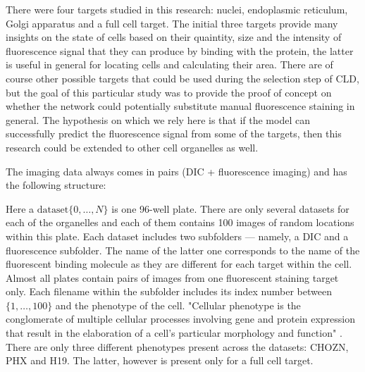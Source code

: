 There were four targets studied in this research: nuclei, endoplasmic reticulum, Golgi apparatus and a full cell target. The initial three targets provide many insights on the state of cells based on their quaintity, size and the intensity of fluorescence signal that they can produce by binding with the protein, the latter is useful in general for locating cells and calculating their area. There are of course other possible targets that could be used during the selection step of CLD, but the goal of this particular study was to provide the proof of concept on whether the network could potentially substitute manual fluorescence staining in general. The hypothesis on which we rely here is that if the model can successfully predict the fluorescence signal from some of the targets, then this research could be extended to other cell organelles as well.

The imaging data always comes in pairs (DIC + fluorescence imaging) and has the following structure:



Here a $\text{dataset}\{0, \ldots, N\}$ is one 96-well plate. There are only several datasets for each of the organelles and each of them contains 100 images of random locations within this plate. Each dataset includes two subfolders --- namely, a DIC and a fluorescence subfolder. The name of the latter one corresponds to the name of the fluorescent binding molecule as they are different for each target within the cell. Almost all plates contain pairs of images from one fluorescent staining target only. Each filename within the subfolder includes its index number between $\{1, \ldots, 100\}$ and the phenotype of the cell. "Cellular phenotype is the conglomerate of multiple cellular processes involving gene and protein expression that result in the elaboration of a cell's particular morphology and function" \cite{Sul_2009}. There are only three different phenotypes present across the datasets: CHOZN, PHX and H19. The latter, however is present only for a full cell target.

